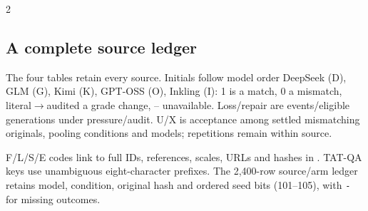 \begin{multicols}{2}
\subsection{A complete source ledger}
\label{app:diagnostic-source-ledger}
The four tables retain every source. Initials follow model order DeepSeek (D),
GLM (G), Kimi (K), GPT-OSS (O), Inkling (I): 1 is a match, 0 a mismatch,
literal$\to$audited a grade change, -- unavailable. Loss/repair are events/eligible
generations under pressure/audit. U/X is acceptance among settled mismatching
originals, pooling conditions and models; repetitions remain within source.

F/L/S/E codes link to full IDs, references, scales, URLs and hashes in
. TAT-QA keys use unambiguous eight-character
prefixes. The 2,400-row source/arm ledger retains model, condition, original
hash and ordered seed bits (101--105), with \texttt{-} for missing outcomes.
\end{multicols}

